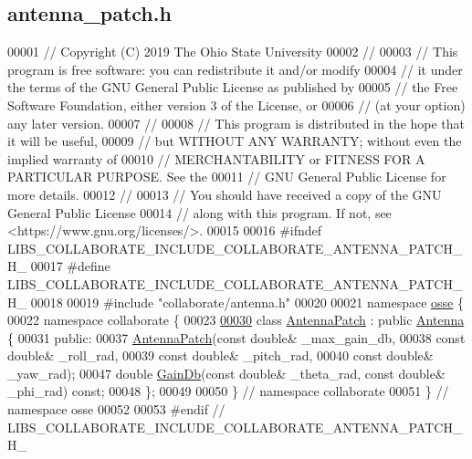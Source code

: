 \hypertarget{antenna__patch_8h_source}{}\subsection{antenna\+\_\+patch.\+h}
\label{antenna__patch_8h_source}

\begin{DoxyCode}
00001 \textcolor{comment}{// Copyright (C) 2019 The Ohio State University}
00002 \textcolor{comment}{//}
00003 \textcolor{comment}{// This program is free software: you can redistribute it and/or modify}
00004 \textcolor{comment}{// it under the terms of the GNU General Public License as published by}
00005 \textcolor{comment}{// the Free Software Foundation, either version 3 of the License, or}
00006 \textcolor{comment}{// (at your option) any later version.}
00007 \textcolor{comment}{//}
00008 \textcolor{comment}{// This program is distributed in the hope that it will be useful,}
00009 \textcolor{comment}{// but WITHOUT ANY WARRANTY; without even the implied warranty of}
00010 \textcolor{comment}{// MERCHANTABILITY or FITNESS FOR A PARTICULAR PURPOSE.  See the}
00011 \textcolor{comment}{// GNU General Public License for more details.}
00012 \textcolor{comment}{//}
00013 \textcolor{comment}{// You should have received a copy of the GNU General Public License}
00014 \textcolor{comment}{// along with this program.  If not, see <https://www.gnu.org/licenses/>.}
00015 
00016 \textcolor{preprocessor}{#ifndef LIBS\_COLLABORATE\_INCLUDE\_COLLABORATE\_ANTENNA\_PATCH\_H\_}
00017 \textcolor{preprocessor}{#define LIBS\_COLLABORATE\_INCLUDE\_COLLABORATE\_ANTENNA\_PATCH\_H\_}
00018 
00019 \textcolor{preprocessor}{#include "collaborate/antenna.h"}
00020 
00021 \textcolor{keyword}{namespace }\hyperlink{namespaceosse}{osse} \{
00022 \textcolor{keyword}{namespace }collaborate \{
00023 
\hyperlink{classosse_1_1collaborate_1_1_antenna_patch}{00030} \textcolor{keyword}{class }\hyperlink{classosse_1_1collaborate_1_1_antenna_patch}{AntennaPatch} : \textcolor{keyword}{public} \hyperlink{classosse_1_1collaborate_1_1_antenna}{Antenna} \{
00031  \textcolor{keyword}{public}:
00037   \hyperlink{classosse_1_1collaborate_1_1_antenna_patch_a317eea4be3b7de724dd8a3d3f83a975f}{AntennaPatch}(\textcolor{keyword}{const} \textcolor{keywordtype}{double}& \_max\_gain\_db,
00038                \textcolor{keyword}{const} \textcolor{keywordtype}{double}& \_roll\_rad,
00039                \textcolor{keyword}{const} \textcolor{keywordtype}{double}& \_pitch\_rad,
00040                \textcolor{keyword}{const} \textcolor{keywordtype}{double}& \_yaw\_rad);
00047   \textcolor{keywordtype}{double} \hyperlink{classosse_1_1collaborate_1_1_antenna_patch_a34cd1ff37a5851f9dab72d737f72d0de}{GainDb}(\textcolor{keyword}{const} \textcolor{keywordtype}{double}& \_theta\_rad, \textcolor{keyword}{const} \textcolor{keywordtype}{double}& \_phi\_rad) \textcolor{keyword}{const};
00048 \};
00049 
00050 \}  \textcolor{comment}{// namespace collaborate}
00051 \}  \textcolor{comment}{// namespace osse}
00052 
00053 \textcolor{preprocessor}{#endif  // LIBS\_COLLABORATE\_INCLUDE\_COLLABORATE\_ANTENNA\_PATCH\_H\_}
\end{DoxyCode}
